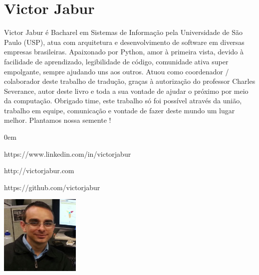 \newpage

\section*{Victor Jabur}

Victor Jabur é Bacharel em Sistemas de Informação pela Universidade de São Paulo (USP), atua com arquitetura e desenvolvimento de software
em diversas empresas brasileiras. Apaixonado por Python, amor à primeira vista, devido à facilidade de aprendizado, legibilidade de código,
comunidade ativa super empolgante, sempre ajudando uns aos outros. Atuou como coordenador / colaborador deste trabalho de tradução, graças
à autorização do professor Charles Severance, autor deste livro e toda a sua vontade de ajudar o próximo por meio da computação. Obrigado time, este trabalho só foi possível através da união, trabalho em equipe, comunicação e vontade de fazer deste mundo um lugar melhor. Plantamos nossa semente ! 

\begin{description}
\itemsep0em 
\item[LinkedIn] https://www.linkedin.com/in/victorjabur
\item[Blog] http://victorjabur.com
\item[GitHub] https://github.com/victorjabur
\end{description}

\beforefig
\centerline{\includegraphics[height=1.50in]{translators/victorjabur.eps}}
\afterfig


\clearemptydoublepage

\begin{latexonly}

\tableofcontents

\clearemptydoublepage

\end{latexonly}

\mainmatter